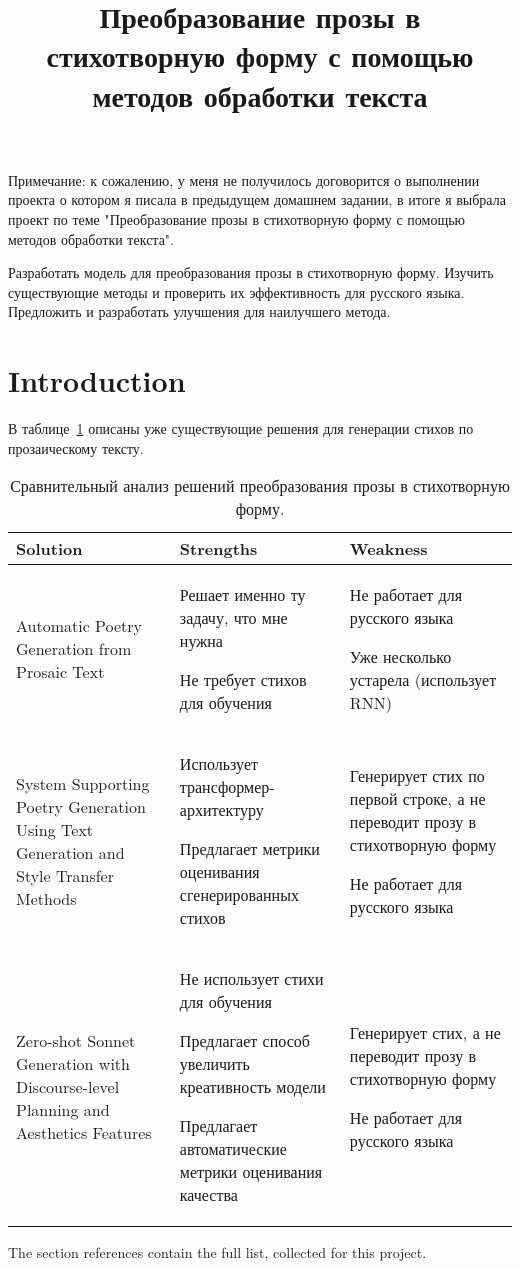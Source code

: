 \documentclass[12pt]{article}
\title{Преобразование прозы в стихотворную форму с помощью методов обработки текста}
\date{}
\begin{document}
\maketitle
Примечание: к сожалению, у меня не получилось договорится о выполнении проекта о котором я писала в предыдущем домашнем задании, в итоге я выбрала проект по теме "Преобразование прозы в стихотворную форму с помощью методов обработки текста".

Разработать модель для преобразования прозы в стихотворную форму. Изучить существующие методы и проверить их эффективность для русского языка. Предложить и разработать улучшения для наилучшего метода.



\section{Introduction}
В таблице~\ref{tab:intro_comparative} описаны уже существующие решения для генерации стихов по прозаическому тексту. 

\begin{table}[!htbp]
\label{tab:intro_comparative}
\caption{Сравнительный анализ решений преобразования прозы в стихотворную форму.}
\begin{tabular}{p{5cm}|p{5cm}|p{5cm}}
	Solution & Strengths & Weakness \\
	\hline
	Automatic Poetry Generation from Prosaic Text~\cite{van-de-cruys-2020-automatic} & 
        Решает именно ту задачу, что мне нужна
        
        Не требует стихов для обучения
        &
	Не работает для русского языка 
        
        Уже несколько устарела (использует RNN)\\
        \hline
        System Supporting Poetry Generation Using Text Generation and Style Transfer Methods~\cite{styletranferBadura} &
        Использует трансформер-архитектуру
        
        Предлагает метрики оценивания сгенерированных стихов &
        Генерирует стих по первой строке, а не переводит прозу в стихотворную форму
        
        Не работает для русского языка\\
        \hline
        Zero-shot Sonnet Generation with Discourse-level Planning and Aesthetics Features~\cite{Zero-shot-Sonnet-Generation} &
        Не использует стихи для обучения
        
        Предлагает способ увеличить креативность модели 
        
        Предлагает автоматические метрики оценивания качества&
        
        Генерирует стих, а не переводит прозу в стихотворную форму
        
        Не работает для русского языка
\end{tabular} 
\end{table}
 
 The section references contain the full list, collected for this project. 
\nocite{*} %



\end{document}
